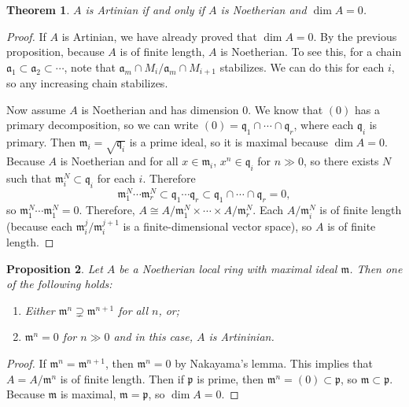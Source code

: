 \documentclass[leqno, openany]{memoir}
\newtheorem{thm}{Theorem}[section]
\newtheorem{prop}[thm]{Proposition}
\theoremstyle{definition}
\theoremstyle{remark}
\theoremstyle{plain}
\theoremstyle{definition}
\theoremstyle{remark}
\newcommand{\mf}[1]{\mathfrak{#1}}
\begin{document}
\begin{thm}
    $A$ is Artinian if and only if $A$ is Noetherian and $\dim A = 0$.
\end{thm}

\begin{proof}
    If $A$ is Artinian, we have already proved that $\dim A = 0$. By the previous proposition, because $A$ is of finite length, $A$ is Noetherian. To see this, for a chain $\mf{a}_1 \subset \mf{a}_2 \subset \cdots$, note that $\mf{a}_m \cap M_i / \mf{a}_m \cap M_{i+1}$ stabilizes. We can do this for each $i$, so any increasing chain stabilizes.

    Now assume $A$ is Noetherian and has dimension $0$. We know that $(0)$ has a primary decomposition, so we can write $(0) = \mf{q}_1 \cap \cdots \cap \mf{q}_r$, where each $\mf{q}_i$ is primary. Then $\mf{m}_i = \sqrt{\mf{q}_i}$ is a prime ideal, so it is maximal because $\dim A = 0$. Because $A$ is Noetherian and for all $x \in \mf{m}_i$, $x^n \in \mf{q}_i$ for $n \gg 0$, so there exists $N$ such that $\mf{m}_i^N \subset \mf{q}_i$ for each $i$. Therefore 
    \[ \mf{m}_1^N \cdots \mf{m}_r^N \subset \mf{q}_1 \cdots \mf{q}_r \subset \mf{q}_1 \cap \cdots \cap \mf{q}_r = 0, \]
    so $\mf{m}_1^N \cdots \mf{m}_1^N = 0$. Therefore, $A \cong A / \mf{m}_1^N \times \cdots \times A / \mf{m}_r^N$. Each $A / \mf{m}_i^N$ is of finite length (because each $\mf{m}_i^j / \mf{m}_i^{j+1}$ is a finite-dimensional vector space), so $A$ is of finite length.
\end{proof}

\begin{prop}
    Let $A$ be a Noetherian local ring with maximal ideal $\mf{m}$. Then one of the following holds:
    \begin{enumerate}[label=(\alph*)]
        \item Either $\mf{m}^n \supsetneq \mf{m}^{n+1}$ for all $n$, or;
        \item $\mf{m}^n = 0$ for $n \gg 0$ and in this case, $A$ is Artininian.
    \end{enumerate}
\end{prop}

\begin{proof}
    If $\mf{m}^n = \mf{m}^{n+1}$, then $\mf{m}^n = 0$ by Nakayama's lemma. This implies that $A = A / \mf{m}^n$ is of finite length. Then if $\mf{p}$ is prime, then $\mf{m}^n = (0) \subset \mf{p}$, so $\mf{m} \subset \mf{p}$. Because $\mf{m}$ is maximal, $\mf{m} = \mf{p}$, so $\dim A = 0$.
\end{proof}
\end{document}
